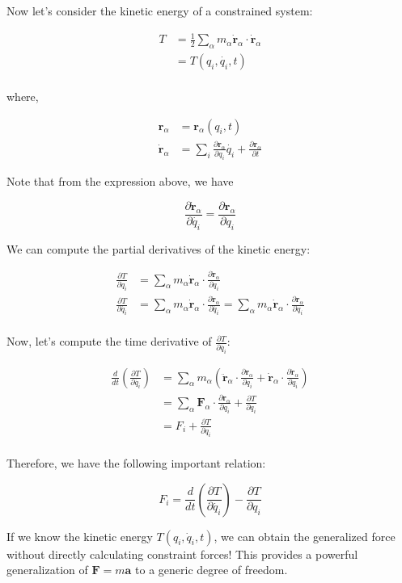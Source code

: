 Now let's consider the kinetic energy of a constrained system:

\begin{align*}
    T &= \frac{1}{2} \sum_{\alpha} m_\alpha \dot{\mathbf{r}}_\alpha \cdot \dot{\mathbf{r}}_\alpha \\
      &= T(q_i, \dot{q_i}, t) \\
\end{align*}

where,

\begin{align*}
    \mathbf{r}_\alpha &= \mathbf{r}_\alpha(q_i, t) \\
    \dot{\mathbf{r}}_\alpha &= \sum_i \frac{\partial \mathbf{r}_\alpha}{\partial q_i} \dot{q_i} + \frac{\partial \mathbf{r}_\alpha}{\partial t}
\end{align*}

Note that from the expression above, we have

\[
    \frac{\partial \dot{\mathbf{r}}_\alpha}{\partial \dot{q_i}} = \frac{\partial \mathbf{r}_\alpha}{\partial q_i}
\]

We can compute the partial derivatives of the kinetic energy:

\begin{align*}
    \frac {\partial T}{\partial q_i} &= \sum_\alpha m_\alpha \dot{\mathbf{r}}_\alpha \cdot \frac{\partial \dot{\mathbf{r}}_\alpha}{\partial q_i} \\
    \frac {\partial T}{\partial \dot{q_i}} &= \sum_\alpha m_\alpha \dot{\mathbf{r}}_\alpha \cdot \frac{\partial \dot{\mathbf{r}}_\alpha}{\partial \dot{q_i}} = \sum_\alpha m_\alpha \dot{\mathbf{r}}_\alpha \cdot \frac{\partial \mathbf{r}_\alpha}{\partial q_i}\\
\end{align*}

Now, let's compute the time derivative of $\frac {\partial T}{\partial \dot{q_i}}$:

\begin{align*}
    \frac{d}{dt} \left(\frac {\partial T}{\partial \dot{q_i}}\right) &= \sum_\alpha m_\alpha \left(\ddot{\mathbf{r}}_\alpha \cdot \frac{\partial \mathbf{r}_\alpha}{\partial q_i} + \dot{\mathbf{r}}_\alpha \cdot \frac{\partial \dot{\mathbf{r}}_\alpha}{\partial q_i}\right) \\
    &= \sum_\alpha \mathbf{F}_\alpha \cdot \frac{\partial \mathbf{r}_\alpha}{\partial q_i} + \frac{\partial T}{\partial q_i} \\
    &= F_i + \frac{\partial T}{\partial q_i} \\
\end{align*}

Therefore, we have the following important relation:

\[
    F_i = \frac{d}{dt} \left(\frac {\partial T}{\partial \dot{q_i}}\right) - \frac{\partial T}{\partial q_i}
\]

If we know the kinetic energy $T(q_i, \dot{q}_i, t)$, we can obtain the generalized force 
without directly calculating constraint forces! This provides a powerful generalization 
of $\mathbf{F} = m\mathbf{a}$ to a generic degree of freedom.